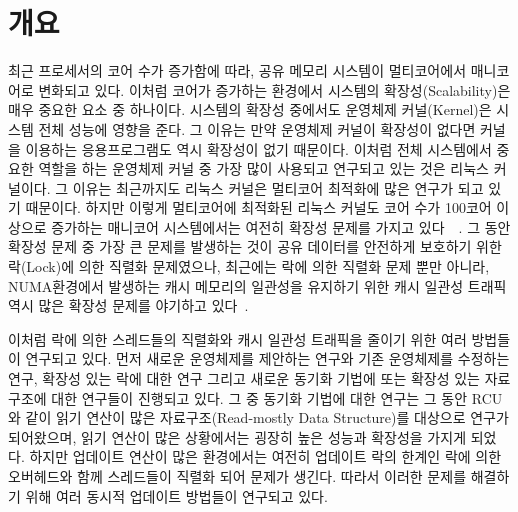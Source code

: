 \section{개요} \label{sec:intro}

최근 프로세서의 코어 수가 증가함에 따라, 공유 메모리 시스템이 멀티코어에서 매니코어로 변화되고 있다.
이처럼 코어가 증가하는 환경에서 시스템의 확장성(Scalability)은 매우 중요한 요소 중 하나이다.
시스템의 확장성 중에서도 운영체제 커널(Kernel)은 시스템 전체 성능에 영향을 준다.
그 이유는 만약 운영체제 커널이 확장성이 없다면 커널을 이용하는 응용프로그램도 역시 확장성이 없기 때문이다.
이처럼 전체 시스템에서 중요한 역할을 하는 운영체제 커널 중 가장 많이 사용되고 연구되고 있는 것은 리눅스 커널이다. 
그 이유는 최근까지도 리눅스 커널은 멀티코어 최적화에 많은 연구가 되고 있기 때문이다. 
하지만 이렇게 멀티코어에 최적화된 리눅스 커널도 코어 수가 100코어 이상으로 증가하는 
매니코어 시스템에서는 여전히 확장성 문제를 가지고 있다~\cite{SilasBoydWickizer2010LinuxScales48}~\cite{Changwoo2016UMSF}.
그 동안 확장성 문제 중 가장 큰 문제를 발생하는 것이 공유 데이터를 안전하게 보호하기 
위한 락(Lock)에 의한 직렬화 문제였으나,
최근에는 락에 의한 직렬화 문제 뿐만 아니라, NUMA환경에서 발생하는 캐시 메모리의 일관성을 
유지하기 위한 캐시 일관성 트래픽 역시 많은 확장성 문제를
야기하고 있다\cite{mckenney2011parallel}~\cite{SilasBoydWickizerPth}.

이처럼 락에 의한 스레드들의 직렬화와 캐시 일관성 트래픽을 줄이기 위한 여러 방법들이 연구되고
있다.
먼저 새로운 운영체제를 제안하는 연구와 
기존 운영체제를 수정하는 연구, 확장성 있는 락에 대한 연구 그리고 새로운 동기화 기법에 
또는 확장성 있는 자료구조에 대한 연구들이 진행되고 있다.
그 중 동기화 기법에 대한 연구는 그 동안 RCU와 같이 읽기 연산이 많은 자료구조(Read-mostly Data Structure)를 
대상으로 연구가 되어왔으며, 읽기 연산이 많은 상황에서는 굉장히 높은 성능과 확장성을 가지게 되었다. 
하지만 업데이트 연산이 많은 환경에서는 여전히 업데이트 락의 한계인 
락에 의한 오버헤드와 함께 스레드들이 직렬화 되어 문제가 생긴다.  
따라서 이러한 문제를 해결하기 위해 여러 동시적 업데이트 방법들이 연구되고 있다.

